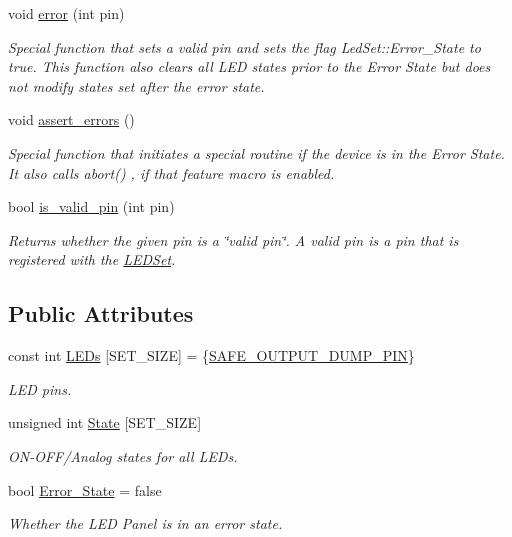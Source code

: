 \begin{DoxyCompactItemize}
void \hyperlink{classLEDSet_aa392b74b090de60a25f7577195327afd}{error} (int pin)
\begin{DoxyCompactList}\small\item\em Special function that sets a valid pin and sets the flag {\ttfamily Led\+Set\+::\+Error\+\_\+\+State} to true. This function also clears all L\+ED states prior to the Error State but does not modify states set after the error state. \end{DoxyCompactList}\item 
void \hyperlink{classLEDSet_aafb42531245febe55685c764c29d918f}{assert\+\_\+errors} ()
\begin{DoxyCompactList}\small\item\em Special function that initiates a special routine if the device is in the Error State. It also calls {\ttfamily abort()} , if that feature macro is enabled. \end{DoxyCompactList}\item 
bool \hyperlink{classLEDSet_ab3c7ec4740bab77f762dcd48fba26579}{is\+\_\+valid\+\_\+pin} (int pin)
\begin{DoxyCompactList}\small\item\em Returns whether the given pin is a \char`\"{}valid pin\char`\"{}. A valid pin is a pin that is registered with the \hyperlink{classLEDSet}{L\+E\+D\+Set}. \end{DoxyCompactList}\end{DoxyCompactItemize}
\subsection*{Public Attributes}
\begin{DoxyCompactItemize}
\item 
const int \hyperlink{classLEDSet_a76dfe34c89f6161184583a5ffdcad2e1}{L\+E\+Ds} \mbox{[}S\+E\+T\+\_\+\+S\+I\+ZE\mbox{]} = \{\hyperlink{pins_8hpp_a2b2fb4f846b45d396215a25f949a1bc7}{S\+A\+F\+E\+\_\+\+O\+U\+T\+P\+U\+T\+\_\+\+D\+U\+M\+P\+\_\+\+P\+IN}\}
\begin{DoxyCompactList}\small\item\em L\+ED pins. \end{DoxyCompactList}\item 
unsigned int \hyperlink{classLEDSet_a7185bf98d8866da93847fde7b2145cc4}{State} \mbox{[}S\+E\+T\+\_\+\+S\+I\+ZE\mbox{]}
\begin{DoxyCompactList}\small\item\em O\+N-\/\+O\+F\+F/\+Analog states for all L\+E\+Ds. \end{DoxyCompactList}\item 
bool \hyperlink{classLEDSet_af9c6ea1d0006d7427c82e8e56f9f2de5}{Error\+\_\+\+State} = false
\begin{DoxyCompactList}\small\item\em Whether the L\+ED Panel is in an error state. \end{DoxyCompactList}\end{DoxyCompactItemize}
